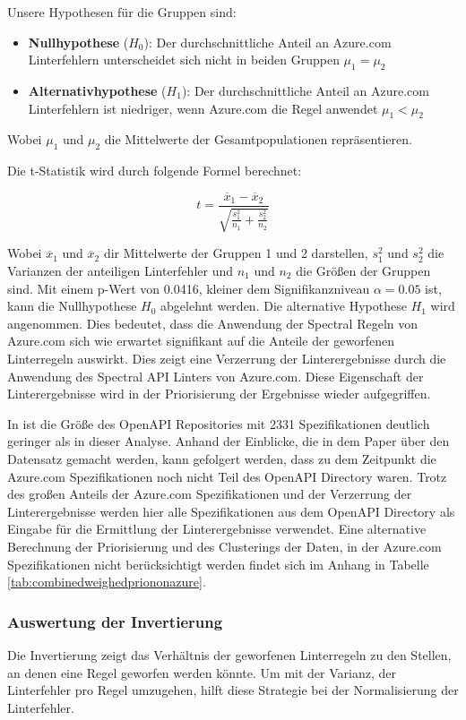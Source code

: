 Unsere Hypothesen für die Gruppen sind:

\begin{itemize}
  \item \textbf{Nullhypothese} ($H_0$): Der durchschnittliche Anteil an Azure.com Linterfehlern unterscheidet sich nicht in beiden Gruppen  $\mu_1 = \mu_2$
  \item \textbf{Alternativhypothese} ($H_1$): Der durchschnittliche Anteil an Azure.com Linterfehlern ist niedriger, wenn Azure.com die Regel anwendet $\mu_1 < \mu_2$
\end{itemize}

Wobei $\mu_1$ und $\mu_2$ die Mittelwerte der Gesamtpopulationen repräsentieren.

Die t-Statistik wird durch folgende Formel berechnet:

\[
t=\frac{\overline{x}_1-\overline{x}_2}{\sqrt{\frac{s_1^2}{n_1}+\frac{s_2^2}{n_2}}}
\]

Wobei $\overline{x}_1$ und $\overline{x}_2$ dir Mittelwerte der Gruppen 1 und 2 darstellen, $s_1^2$ und $s_2^2$ die Varianzen der anteiligen Linterfehler und $n_1$ und $n_2$ die Größen der Gruppen sind.
Mit einem p-Wert von 0.0416, kleiner dem Signifikanzniveau $\alpha = 0.05$ ist, kann die Nullhypothese $H_0$ abgelehnt werden. Die alternative Hypothese $H_1$ wird angenommen. Dies bedeutet, dass die Anwendung der Spectral Regeln von Azure.com sich wie erwartet signifikant auf die Anteile der geworfenen Linterregeln auswirkt. Dies zeigt eine Verzerrung der Linterergebnisse durch die Anwendung des Spectral \acs{API} Linters von Azure.com. Diese Eigenschaft der Linterergebnisse wird in der Priorisierung der Ergebnisse wieder aufgegriffen. 

In \parencite{bogner_restruler_2024} ist die Größe des OpenAPI Repositories mit 2331 Spezifikationen deutlich geringer als in dieser Analyse. Anhand der Einblicke, die in dem Paper über den Datensatz gemacht werden, kann gefolgert werden, dass zu dem Zeitpunkt die Azure.com Spezifikationen noch nicht Teil des OpenAPI Directory waren. Trotz des großen Anteils der Azure.com Spezifikationen und der Verzerrung der Linterergebnisse werden hier alle Spezifikationen aus dem OpenAPI Directory als Eingabe für die Ermittlung der Linterergebnisse verwendet. Eine alternative Berechnung der Priorisierung und des Clusterings der Daten, in der Azure.com Spezifikationen nicht berücksichtigt werden findet sich im Anhang in Tabelle \ref{tab:combinedweighedpriononazure}.


\subsubsection{Auswertung der Invertierung} \label{sec:auswertungderinvertierung}
Die Invertierung zeigt das Verhältnis der geworfenen Linterregeln zu den Stellen, an denen eine Regel geworfen werden könnte. Um mit der Varianz, der Linterfehler pro Regel umzugehen, hilft diese Strategie bei der Normalisierung der Linterfehler. 

